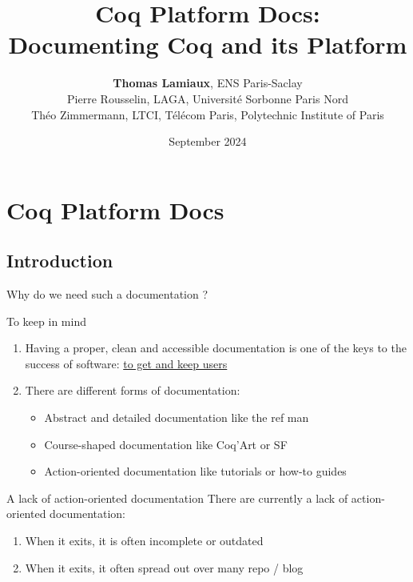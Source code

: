 \documentclass[10pt]{beamer}
\title{Coq Platform Docs: \\ Documenting Coq and its Platform}
\author{\textbf{Thomas Lamiaux}, ENS Paris-Saclay \\
Pierre Rousselin, LAGA, Université Sorbonne Paris Nord \\
Théo Zimmermann, LTCI, Télécom Paris, Polytechnic Institute of Paris }
\date{September 2024}
\begin{document}
\begin{frame}
    \maketitle
\end{frame}


\section*{Coq Platform Docs}

\subsection{Introduction}

\begin{frame}{Why do we need such a documentation ?}
  \begin{tcbProp}{To keep in mind}
    \begin{enumerate}
      \item Having a proper, clean and accessible documentation is one of the
            keys to the success of software: \ul{to get and keep users}
      \item<2-> There are different forms of documentation:
      \begin{itemize}[label=$-$]
        \item Abstract and detailed documentation like the ref man
        \item Course-shaped documentation like Coq'Art or SF
        \item Action-oriented documentation like tutorials or how-to guides
      \end{itemize}
    \end{enumerate}
  \end{tcbProp}
  \begin{tcbPbl}{A lack of action-oriented documentation }
    There are currently a lack of action-oriented documentation:
    \begin{enumerate}
      \item When it exits, it is often incomplete or outdated
      \item When it exits, it often spread out over many repo / blog
    \end{enumerate}
  \end{tcbPbl}
\end{frame}
\end{document}
